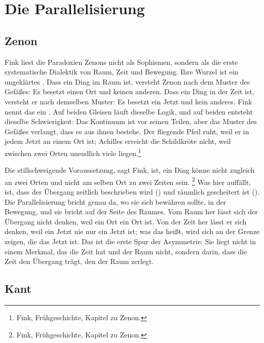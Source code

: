 \chapter{Die Parallelisierung}

\section{Zenon}

Fink liest die Paradoxien Zenons nicht als Sophismen, sondern als die erste systematische Dialektik von Raum, Zeit und Bewegung. Ihre Wurzel ist ein ungeklärtes . Dass ein Ding im Raum ist, versteht Zenon nach dem Muster des Gefäßes: Es besetzt einen Ort und keinen anderen. Dass ein Ding in der Zeit ist, versteht er nach demselben Muster: Es besetzt ein Jetzt und kein anderes. Fink nennt das ein . Auf beiden Gleisen läuft dieselbe Logik, und auf beiden entsteht dieselbe Schwierigkeit: Das Kontinuum ist vor seinen Teilen, aber das Muster des Gefäßes verlangt, dass es aus ihnen bestehe. Der fliegende Pfeil ruht, weil er in jedem Jetzt an einem Ort ist; Achilles erreicht die Schildkröte nicht, weil zwischen zwei Orten unendlich viele liegen.\footnote{Fink, Frühgeschichte, Kapitel zu Zenon.}

Die stillschweigende Voraussetzung, sagt Fink, ist, ein Ding könne nicht zugleich an zwei Orten und nicht am selben Ort zu zwei Zeiten sein. \footnote{Fink, Frühgeschichte, Kapitel zu Zenon.} Was hier auffällt, ist, dass der Übergang zeitlich beschrieben wird () und räumlich gescheitert ist (). Die Parallelisierung bricht genau da, wo sie sich bewähren sollte, in der Bewegung, und sie bricht auf der Seite des Raumes. Vom Raum her lässt sich der Übergang nicht denken, weil ein Ort ein Ort ist. Von der Zeit her lässt er sich denken, weil ein Jetzt nie nur ein Jetzt ist; was das heißt, wird sich an der Grenze zeigen, die das Jetzt ist. Das ist die erste Spur der Asymmetrie: Sie liegt nicht in einem Merkmal, das die Zeit hat und der Raum nicht, sondern darin, dass die Zeit den Übergang trägt, den der Raum zerlegt.

\section{Kant}

